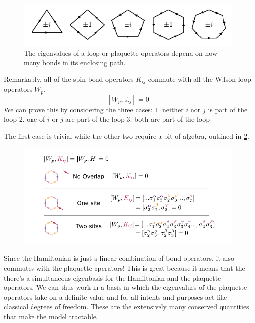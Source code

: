 \begin{figure}
\hypertarget{fig:regular_plaquettes}{%
\centering
\includegraphics{figure_code/amk_chapter/regular_plaquettes/regular_plaquettes.pdf}
\caption{The eigenvalues of a loop or plaquette operators depend on how
many bonds in its enclosing path.}\label{fig:regular_plaquettes}
}
\end{figure}

Remarkably, all of the spin bond operators \(K_{ij}\) commute with all
the Wilson loop operators \(W_p\). \[[W_p, J_{ij}] = 0\] We can prove
this by considering the three cases: 1. neither \(i\) nor \(j\) is part
of the loop 2. one of \(i\) or \(j\) are part of the loop 3. both are
part of the loop

The first case is trivial while the other two require a bit of algebra,
outlined in \cref{fig:visual_kitaev_2}.

\begin{figure}
\hypertarget{fig:visual_kitaev_2}{%
\centering
\includegraphics{figure_code/amk_chapter/visual_kitaev_2.pdf}
\caption{}\label{fig:visual_kitaev_2}
}
\end{figure}

Since the Hamiltonian is just a linear combination of bond operators, it
also commutes with the plaquette operators! This is great because it
means that the there's a simultaneous eigenbasis for the Hamiltonian and
the plaquette operators. We can thus work in a basis in which the
eigenvalues of the plaquette operators take on a definite value and for
all intents and purposes act like classical degrees of freedom. These
are the extensively many conserved quantities that make the model
tractable.

